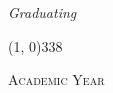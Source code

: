 \begin{titlepage}
\begin{center}
\begin{large}
\begin{flushright}
\textit{Graduating}\\ 
\vspace{5pt} 
\myName
\end{flushright}
\end{large}

\vspace{20pt}

\line(1, 0){338} \\
\begin{normalsize}
\textsc{Academic Year \myAA}
\end{normalsize}

\end{center}
\end{titlepage} 